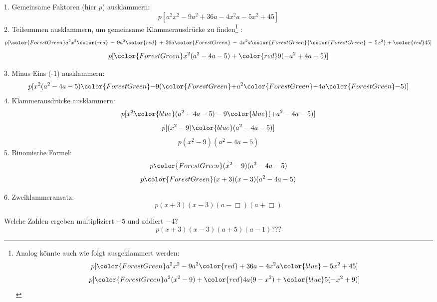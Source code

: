 
1. Gemeinsame Faktoren (hier $p$) ausklammern:
$$p[a^2x^2 - 9a^2 + 36a -4x^2a -5x^2 + 45]$$
2. Teilsummen ausklammern, um gemeinsame Klammerausdrücke zu finden\footnote{
Analog könnte auch wie folgt ausgeklammert werden:
$$p[{\color{ForestGreen}a^2x^2 -9a^2} {\color{red}+ 36a -4x^2a} {\color{blue}- 5x^2 + 45}]$$
$$p[{\color{ForestGreen}a^2}(x^2 - 9) + {\color{red}4a}(9 - x^2) + {\color{blue}5}(-x^2 + 9)]$$
}
:
$$p[{\color{ForestGreen}a^2x^2 } {\color{red}\, -\, 9a^2} {\color{red}\, +\, 36a} {\color{ForestGreen}\, -\, 4x^2a} {\color{ForestGreen} {\color{ForestGreen}\,-\,5x^2} } + {\color{red}45}]$$
$$p[{\color{ForestGreen}x^2} (a^2 -4a -5) + {\color{red}9}(-a^2 + 4a +5)]$$

3. Minus Eins (-1) ausklammern:
$$p[x^2 (a^2 -4a -5) {\color{ForestGreen}-} 9({\color{ForestGreen}+}a^2 {\color{ForestGreen}-} 4a {\color{ForestGreen}-} 5)]$$
4. Klammerausdrücke ausklammern:
$$p[x^2 {\color{blue}(a^2 -4a -5)} - 9{\color{blue}(+a^2 - 4a - 5)}]$$
$$p[(x^2-9) {\color{blue}(a^2 -4a -5)}]$$
$$p(x^2-9) (a^2 -4a -5)$$
5. Binomische Formel:
$$p{\color{ForestGreen}(x^2-9)}(a^2 -4a -5)$$
$$p{\color{ForestGreen}(x+3)(x-3)}(a^2 -4a -5)$$

6. Zweiklammeransatz:
$$p(x+3)(x-3) (a-\Box{})(a+\Box{})$$

Welche Zahlen ergeben multipliziert $-5$ und addiert $-4$?
$$p(x+3)(x-3)(a+5)(a-1) ???$$
\begin{center}{}\end{center}







\newpage

